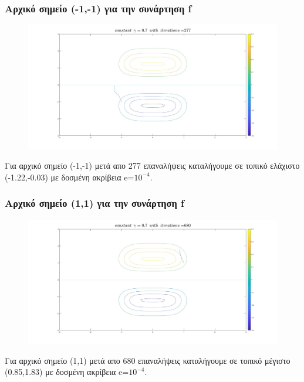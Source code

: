 \documentclass{article}
\begin{document}
\subsubsection*{Αρχικό σημείο (-1,-1) για την συνάρτηση f}
\begin{figure}[h!]	
     \centering  
     \advance\leftskip-0.2cm  
  \includegraphics[width=140mm,scale=2]{t1b.jpg}
\end{figure} 
Για αρχικό σημείο (-1,-1) μετά απο 277 επαναλήψεις καταλήγουμε σε τοπικό ελάχιστο (-1.22,-0.03) με δοσμένη ακρίβεια e=$10^{-4}$.
\clearpage
\subsubsection*{Αρχικό σημείο (1,1) για την συνάρτηση f}
\begin{figure}[h!]	
     \centering  
     \advance\leftskip-0.2cm  
  \includegraphics[width=140mm,scale=2]{t1c.jpg}
\end{figure} 
Για αρχικό σημείο (1,1) μετά απο 680 επαναλήψεις καταλήγουμε σε τοπικό μέγιστο (0.85,1.83) με δοσμένη ακρίβεια e=$10^{-4}$.
\end{document}

